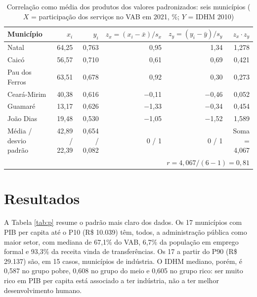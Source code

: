 \documentclass[12pt,a4paper]{article}
\newcommand{\fonte}[1]{\par\vspace{2pt}{\centering\small #1\par}\vspace{2pt}}
\begin{document}
\begin{table}[!htb]
\centering
\caption{Correlação como média dos produtos dos valores padronizados: seis municípios ($X$ = participação dos serviços no VAB em 2021, \%; $Y$ = IDHM 2010)}
\label{tab:z}
\footnotesize
\begin{tabular}{@{}lrrrrr@{}}
\toprule
Município & $x_i$ & $y_i$ & $z_x = (x_i - \bar{x})/s_x$ & $z_y = (y_i - \bar{y})/s_y$ & $z_x \cdot z_y$ \\
\midrule
Natal & 64,25 & 0,763 & 0,95 & 1,34 & 1,278 \\
Caicó & 56,57 & 0,710 & 0,61 & 0,69 & 0,421 \\
Pau dos Ferros & 63,51 & 0,678 & 0,92 & 0,30 & 0,273 \\
Ceará-Mirim & 40,38 & 0,616 & $-$0,11 & $-$0,46 & 0,052 \\
Guamaré & 13,17 & 0,626 & $-$1,33 & $-$0,34 & 0,454 \\
João Dias & 19,48 & 0,530 & $-$1,05 & $-$1,52 & 1,589 \\
\midrule
Média / desvio padrão & 42,89 / 22,39 & 0,654 / 0,082 & 0 / 1 & 0 / 1 & Soma = 4,067 \\
\multicolumn{6}{r}{$r = 4{,}067 / (6 - 1) = 0{,}81$} \\
\bottomrule
\end{tabular}
\fonte{Fonte: elaborada pelo autor (2026) com dados do IBGE (2023) e IBGE Cidades.}
\end{table}

\section{Resultados}

A Tabela \ref{tab:p} resume o padrão mais claro dos dados. Os 17 municípios com PIB per capita até o P10 (R\$ 10.039) têm, todos, a administração pública como maior setor, com mediana de 67,1\% do VAB, 6,7\% da população em emprego formal e 93,3\% da receita vinda de transferências. Os 17 a partir do P90 (R\$ 29.137) são, em 15 casos, municípios de indústria. O IDHM mediano, porém, é 0,587 no grupo pobre, 0,608 no grupo do meio e 0,605 no grupo rico: ser muito rico em PIB per capita está associado a ter indústria, não a ter melhor desenvolvimento humano.
\end{document}
